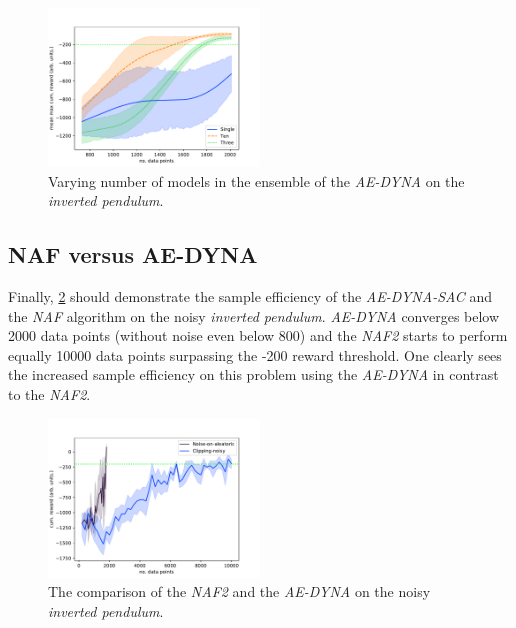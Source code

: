 \documentclass[
reprint,
amsmath,amssymb,amsfonts,clevref,
aps,
prstab,
]{revtex4-2}
\begin{document}
\begin{figure}[!h]
	\centering
	\includegraphics*[width=0.5\textwidth]{Figures/Comparison_models_sizes}
	\caption{Varying number of models in the ensemble of the \emph{AE-DYNA} on the \emph{inverted pendulum}.}
	\label{fig:Compare_models_sizes}
\end{figure}
\subsection{NAF versus AE-DYNA}
	Finally, \cref{fig:comparsion_NAF_AE-DYNA} should demonstrate the sample efficiency of the \emph{AE-DYNA-SAC} and the \emph{NAF} algorithm on the noisy \emph{inverted pendulum}. \emph{AE-DYNA} converges below 2000 data points (without noise even below 800) and the \emph{NAF2} starts to perform equally 10000 data points surpassing the -200 reward threshold. One clearly sees the increased sample efficiency on this problem using the \emph{AE-DYNA} in contrast to the \emph{NAF2}.
		\begin{figure}[!h]
		\centering
		\includegraphics*[width=0.5\textwidth]{Figures/Comparison_NAF_AE-DYNA}
		\caption{The comparison of the \emph{NAF2} and the \emph{AE-DYNA} on the noisy \emph{inverted pendulum}.}
		\label{fig:comparsion_NAF_AE-DYNA}
	\end{figure}
\end{document}
